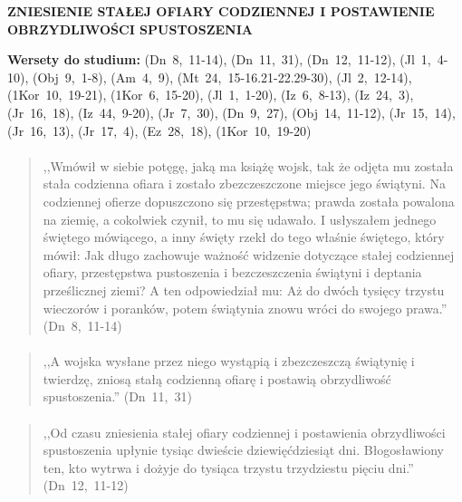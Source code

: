 \documentclass[10pt,a4paper,oneside]{article}
\begin{document}
\centerline{\textbf{\MakeUppercase{Zniesienie stałej ofiary codziennej i postawienie obrzydliwości spustoszenia}}}
\begin{center}
\textbf{Wersety do studium:} 
\mbox{(Dn 8, 11-14)}, \mbox{(Dn 11, 31)}, \mbox{(Dn 12, 11-12)}, \mbox{(Jl 1, 4-10)}, \mbox{(Obj 9, 1-8)}, \mbox{(Am 4, 9)}, \mbox{(Mt 24, 15-16.21-22.29-30)}, \mbox{(Jl 2, 12-14)}, \mbox{(1Kor 10, 19-21)}, \mbox{(1Kor 6, 15-20)}, \mbox{(Jl 1, 1-20)}, \mbox{(Iz 6, 8-13)}, \mbox{(Iz 24, 3)}, \mbox{(Jr 16, 18)}, \mbox{(Iz 44, 9-20)}, \mbox{(Jr 7, 30)}, \mbox{(Dn 9, 27)}, \mbox{(Obj 14, 11-12)}, \mbox{(Jr 15, 14)}, \mbox{(Jr 16, 13)}, \mbox{(Jr 17, 4)}, \mbox{(Ez 28, 18)}, \mbox{(1Kor 10, 19-20)}
\end{center}
\paragraph{}
\begin{quote}
,,Wmówił w siebie potęgę, jaką ma książę wojsk, tak że odjęta mu została stała codzienna ofiara i zostało zbezczeszczone miejsce jego świątyni. Na codziennej ofierze dopuszczono się przestępstwa; prawda została powalona na ziemię, a cokolwiek czynił, to mu się udawało. I usłyszałem jednego świętego mówiącego, a inny święty rzekł do tego właśnie świętego, który mówił: Jak długo zachowuje ważność widzenie dotyczące stałej codziennej ofiary, przestępstwa pustoszenia i bezczeszczenia świątyni i deptania prześlicznej ziemi? A ten odpowiedział mu: Aż do dwóch tysięcy trzystu wieczorów i poranków, potem świątynia znowu wróci do swojego prawa.'' \mbox{(Dn 8, 11-14)}
\end{quote}
\paragraph{}
\begin{quote}
,,A wojska wysłane przez niego wystąpią i zbezczeszczą świątynię i twierdzę, zniosą stałą codzienną ofiarę i postawią obrzydliwość spustoszenia.'' \mbox{(Dn 11, 31)}
\end{quote}
\paragraph{}
\begin{quote}
,,Od czasu zniesienia stałej ofiary codziennej i postawienia obrzydliwości spustoszenia upłynie tysiąc dwieście dziewięćdziesiąt dni. Błogosławiony ten, kto wytrwa i dożyje do tysiąca trzystu trzydziestu pięciu dni.'' \mbox{(Dn 12, 11-12)}
\end{quote}
\end{document}
